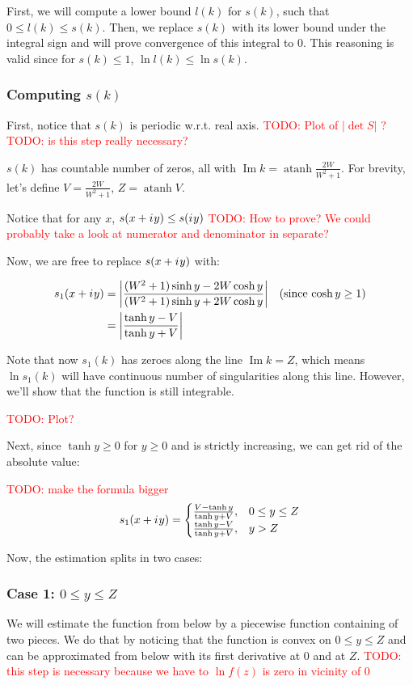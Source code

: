 \documentclass[12pt, a4paper]{article}
\newcommand{\abs}[1]{\left| #1 \right|}
\newcommand{\iu}{{i\mkern1mu}}
\renewcommand{\Im}{\operatorname{Im}}
\newcommand{\todo}[1]{{\large \textcolor{red}{TODO: #1}}}
\DeclareMathOperator\atanh{atanh}
\begin{document}
First, we will compute a lower bound $l(k)$ for $s(k)$, such that $0 \le l(k) \le s(k)$. Then, we replace $s(k)$ with its lower bound under the integral sign and will prove convergence of this integral to $0$. This reasoning is valid since for $s(k) \le 1$, $\ln l(k) \le \ln s(k)$.

\subsubsection{Computing $s(k)$}
First, notice that $s(k)$ is periodic w.r.t. real axis.
\todo{Plot of $\abs{\det S}$ ?}
\todo{is this step really necessary?}

$s(k)$ has countable number of zeros, all with $\Im k = \atanh \frac{2 W}{W^2 + 1}$. For brevity, let's define $V = \frac{2 W}{W^2 + 1}$, $Z = \atanh V$.

Notice that for any $x$, $s(x + \iu y) \le s(\iu y)$
\todo{How to prove? We could probably take a look at numerator and denominator in separate?}

Now, we are free to replace $s(x + \iu y)$ with:

\begin{align*}
s_1(x + \iu y)
 &= \abs{\frac{(W^2 + 1) \sinh y - 2 W \cosh y}{(W^2 + 1) \sinh y + 2 W \cosh y}} && \text{(since $\cosh y \ge 1$)}\\
 &= \abs{\frac{\tanh y - V}{\tanh y + V}}
\end{align*}

Note that now $s_1(k)$ has zeroes along the line $\Im k = Z$, which means $\ln s_1(k)$ will have continuous number of singularities along this line. However, we'll show that the function is still integrable.

\todo{Plot?}

Next, since $\tanh y \ge 0$ for $y \ge 0$ and is strictly increasing, we can get rid of the absolute value:

\todo{make the formula bigger}
\[
s_1(x + \iu y)
 = \begin{cases}
 \frac{V - \tanh y}{\tanh y + V}, & 0 \le y \le Z \\
 \frac{\tanh y - V}{\tanh y + V}, & y > Z 
 \end{cases}
\]

Now, the estimation splits in two cases:

\subsubsection*{Case 1: $0 \le y \le Z$}
We will estimate the function from below by a piecewise function containing of two pieces. We do that by noticing that the function is convex on $0 \le y \le Z$ and can be approximated from below with its first derivative at $0$ and at $Z$. 
\todo{this step is necessary because we have to $\ln f(z)$ is zero in vicinity of 0}
\end{document}
